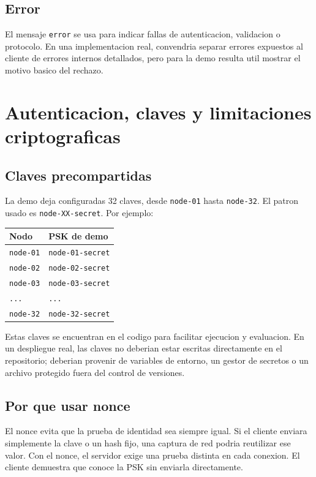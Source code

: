 \documentclass[11pt,letterpaper]{article}
\begin{document}
\subsection{Error}

El mensaje \texttt{error} se usa para indicar fallas de autenticacion,
validacion o protocolo. En una implementacion real, convendria separar errores
expuestos al cliente de errores internos detallados, pero para la demo resulta
util mostrar el motivo basico del rechazo.

\newpage
\section{Autenticacion, claves y limitaciones criptograficas}

\subsection{Claves precompartidas}

La demo deja configuradas 32 claves, desde \texttt{node-01} hasta
\texttt{node-32}. El patron usado es \texttt{node-XX-secret}. Por ejemplo:

\begin{longtable}{|p{}|p{}|}
\hline
\textbf{Nodo} & \textbf{PSK de demo} \\
\hline
\texttt{node-01} & \texttt{node-01-secret} \\
\hline
\texttt{node-02} & \texttt{node-02-secret} \\
\hline
\texttt{node-03} & \texttt{node-03-secret} \\
\hline
\texttt{...} & \texttt{...} \\
\hline
\texttt{node-32} & \texttt{node-32-secret} \\
\hline
\end{longtable}

Estas claves se encuentran en el codigo para facilitar ejecucion y evaluacion.
En un despliegue real, las claves no deberian estar escritas directamente en el
repositorio; deberian provenir de variables de entorno, un gestor de secretos o
un archivo protegido fuera del control de versiones.

\subsection{Por que usar nonce}

El nonce evita que la prueba de identidad sea siempre igual. Si el cliente
enviara simplemente la clave o un hash fijo, una captura de red podria reutilizar
ese valor. Con el nonce, el servidor exige una prueba distinta en cada conexion.
El cliente demuestra que conoce la PSK sin enviarla directamente.
\end{document}
